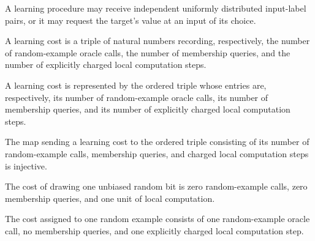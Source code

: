 \begin{definition}
\label{FABL.LearningAccess}
\leanok
A learning procedure may receive independent uniformly distributed input-label pairs, or
it may request the target’s value at an input of its choice.
\end{definition}

\begin{definition}
\label{FABL.LearningCost}
\leanok
A learning cost is a triple of natural numbers recording, respectively, the number of
random-example oracle calls, the number of membership queries, and the number of
explicitly charged local computation steps.
\end{definition}

\begin{definition}
\label{FABL.LearningCost.toTriple}
\leanok
{}
A learning cost is represented by the ordered triple whose entries are, respectively,
its number of random-example oracle calls, its number of membership queries, and its
number of explicitly charged local computation steps.
\end{definition}

\begin{theorem}
\label{FABL.LearningCost.toTriple_injective}
\leanok
{}
The map sending a learning cost to the ordered triple consisting of its number of
random-example calls, membership queries, and charged local computation steps is
injective.
\end{theorem}

\begin{definition}
\label{FABL.LearningCost.coin}
\leanok
{}
The cost of drawing one unbiased random bit is zero random-example calls, zero
membership queries, and one unit of local computation.
\end{definition}

\begin{definition}
\label{FABL.LearningCost.example}
\leanok
{}
The cost assigned to one random example consists of one random-example oracle call, no
membership queries, and one explicitly charged local computation step.
\end{definition}

